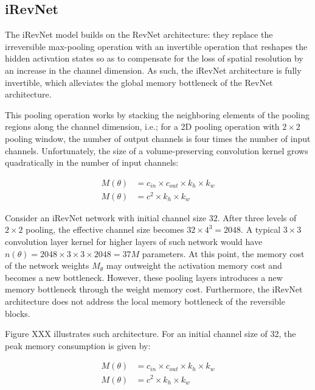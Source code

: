 \documentclass[twocolumn]{bmcart}
\begin{document}
\subsection{iRevNet}

The iRevNet model builds on the RevNet architecture: they replace the irreversible max-pooling operation with an invertible operation that reshapes the hidden activation states
so as to compensate for the loss of spatial resolution by an increase in the channel dimension. 
As such, the iRevNet architecture is fully invertible, which alleviates the global memory bottleneck of the RevNet architecture.

This pooling operation works by stacking the neighboring elements of the pooling regions along the channel dimension, 
i.e.; for a 2D pooling operation with $2 \times 2$ pooling window, the number of output channels is four times the number of input channels. 
Unfortunately, the size of a volume-preserving convolution kernel grows quadratically in the number of input channels:

\begin{subequations}
\begin{align}
M(\theta) &= c_{in} \times c_{out} \times k_h \times k_w \\
M(\theta) &= c^2 \times k_h \times k_w
\end{align}
\end{subequations}

Consider an iRevNet network with initial channel size 32.
After three levels of $2 \times 2$ pooling, the effective channel size becomes $32 \times 4^3=2048$. A typical $3 \times 3$ convolution layer kernel for higher layers of such network would have $n(\theta)=2048 \times 3 \times 3 \times 2048=37M$ parameters.
At this point, the memory cost of the network weights $M_{\theta}$ may outweight the activation memory cost and becomes a new bottleneck.
However, these pooling layers introduces a new memory bottleneck through the weight memory cost.
Furthermore, the iRevNet architecture does not address the local memory bottleneck of the reversible blocks.

Figure XXX illustrates such architecture. For an initial channel size of 32, the peak memory consumption is given by:

\begin{subequations}
\begin{align}
M(\theta) &= c_{in} \times c_{out} \times k_h \times k_w \\
M(\theta) &= c^2 \times k_h \times k_w
\end{align}
\end{subequations}
\end{document}
